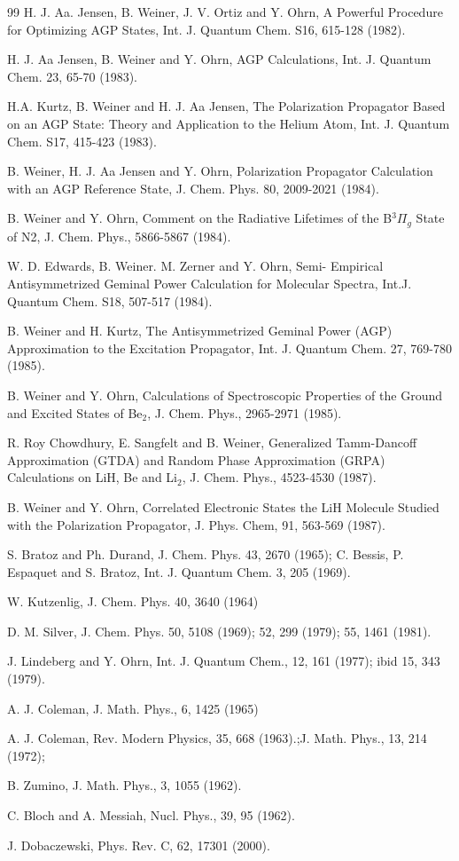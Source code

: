 \documentclass{article}
\begin{document}
\begin{thebibliography}{99}
 H. J. Aa. Jensen, B. Weiner, J. V. Ortiz and Y. Ohrn, A
Powerful Procedure for Optimizing AGP States, Int. J. Quantum Chem. S16,
615-128 (1982).

 H. J. Aa Jensen, B. Weiner and Y. Ohrn, AGP Calculations,
Int. J. Quantum Chem. 23, 65-70 (1983).

 H.A. Kurtz, B. Weiner and H. J. Aa Jensen, The Polarization
Propagator Based on an AGP State: Theory and Application to the Helium Atom,
Int. J. Quantum Chem. S17, 415-423 (1983).

 B. Weiner, H. J. Aa Jensen and Y. Ohrn, Polarization
Propagator Calculation with an AGP Reference State, J. Chem. Phys. 80,
2009-2021 (1984).

 B. Weiner and Y. Ohrn, Comment on the Radiative Lifetimes
of the B$^{3}\Pi _{g}$ State of N2, J. Chem. Phys., 5866-5867 (1984).

 W. D. Edwards, B. Weiner. M. Zerner and Y. Ohrn, Semi-
Empirical Antisymmetrized Geminal Power Calculation for Molecular Spectra,
Int.J. Quantum Chem. S18, 507-517 (1984).

 B. Weiner and H. Kurtz, The Antisymmetrized Geminal Power
(AGP) Approximation to the Excitation Propagator, Int. J. Quantum Chem. 27,
769-780 (1985).

 B. Weiner and Y. Ohrn, Calculations of Spectroscopic
Properties of the Ground and Excited States of Be$_{2}$, J. Chem. Phys.,
2965-2971 (1985).

 R. Roy Chowdhury, E. Sangfelt and B. Weiner,
Generalized Tamm-Dancoff Approximation (GTDA) and Random Phase Approximation
(GRPA) Calculations on LiH, Be and Li$_{2}$, J. Chem. Phys., 4523-4530
(1987).

 B. Weiner and Y. Ohrn, Correlated Electronic States the
LiH Molecule Studied with the Polarization Propagator, J. Phys. Chem, 91,
563-569 (1987).

 S. Bratoz and Ph. Durand, J. Chem. Phys. 43, 2670 (1965);
C. Bessis, P. Espaquet and S. Bratoz, Int. J. Quantum Chem. 3, 205 (1969).

 W. Kutzenlig, J. Chem. Phys. 40, 3640 (1964)

 D. M. Silver, J. Chem. Phys. 50, 5108 (1969); 52, 299
(1979); 55, 1461 (1981).

 J. Lindeberg and Y. Ohrn, Int. J. Quantum Chem., 12,
161 (1977); ibid 15, 343 (1979).

 A. J. Coleman, J. Math. Phys., 6, 1425 (1965)

 A. J. Coleman, Rev. Modern Physics, 35, 668 (1963).;J.
Math. Phys., 13, 214 (1972);

 B. Zumino, J. Math. Phys., 3, 1055 (1962).

 C. Bloch and A. Messiah, Nucl. Phys., 39, 95 (1962).

 J. Dobaczewski, Phys. Rev. C, 62, 17301 (2000).
\end{thebibliography}
\end{document}
